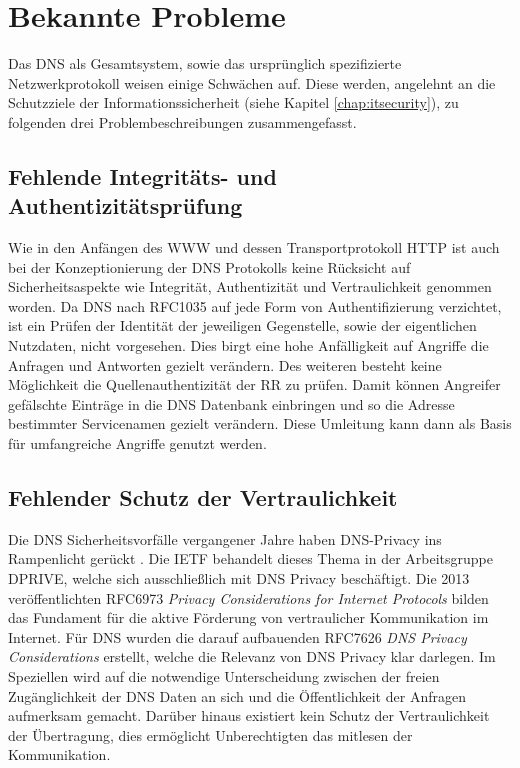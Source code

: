 \chapter{Bekannte Probleme}
\label{chap:threads}

Das DNS als Gesamtsystem, sowie das ursprünglich spezifizierte Netzwerkprotokoll weisen einige Schwächen auf. Diese werden, angelehnt an die Schutzziele der Informationssicherheit (siehe Kapitel \ref{chap:itsecurity}), zu folgenden drei Problembeschreibungen zusammengefasst.   

\section{Fehlende Integritäts- und Authentizitätsprüfung}
\label{sec:thread-auth}

Wie in den Anfängen des \ac{WWW} und dessen Transportprotokoll \ac{HTTP} ist auch bei der Konzeptionierung der DNS Protokolls keine Rücksicht auf Sicherheitsaspekte wie Integrität, Authentizität und Vertraulichkeit genommen worden. Da DNS nach RFC1035\cite{rfc1035} auf jede Form von Authentifizierung verzichtet, ist ein Prüfen der Identität der jeweiligen Gegenstelle, sowie der eigentlichen Nutzdaten, nicht vorgesehen. Dies birgt eine hohe Anfälligkeit auf Angriffe die Anfragen und Antworten gezielt verändern. Des weiteren besteht keine Möglichkeit die Quellenauthentizität der RR zu prüfen. Damit können Angreifer gefälschte Einträge in die DNS Datenbank einbringen und so die Adresse bestimmter Servicenamen gezielt verändern. Diese Umleitung kann dann als Basis für umfangreiche Angriffe genutzt werden.

\section{Fehlender Schutz der Vertraulichkeit}
\label{sec:thread-priv}

Die DNS Sicherheitsvorfälle vergangener Jahre haben DNS-Privacy ins Rampenlicht gerückt  \cite{Greenwald2013}\cite{turkybbc2017}\cite{turkywp2018}. Die \ac{IETF} behandelt dieses Thema in der Arbeitsgruppe DPRIVE, welche sich ausschließlich mit DNS Privacy beschäftigt. Die 2013 veröffentlichten RFC6973 \textit{Privacy Considerations for Internet Protocols}\cite{rfc6973} bilden das Fundament für die aktive Förderung von vertraulicher Kommunikation im Internet. Für DNS wurden die darauf aufbauenden RFC7626 \textit{DNS Privacy Considerations} \cite{rfc7626} erstellt, welche die Relevanz von DNS Privacy klar darlegen. Im Speziellen wird auf die notwendige Unterscheidung zwischen der freien Zugänglichkeit der DNS Daten an sich und die Öffentlichkeit der Anfragen aufmerksam gemacht. Darüber hinaus existiert kein Schutz der Vertraulichkeit der Übertragung, dies ermöglicht Unberechtigten das mitlesen der Kommunikation.

